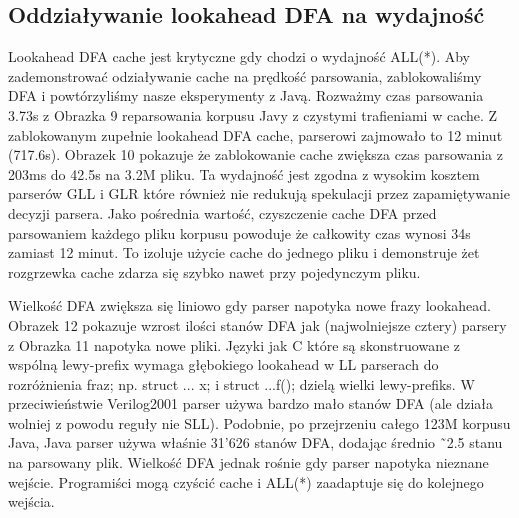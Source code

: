 \subsection{Oddziaływanie lookahead DFA na wydajność}
Lookahead DFA cache jest krytyczne gdy chodzi o wydajność ALL(*).
Aby zademonstrować odziaływanie cache na prędkość parsowania, zablokowaliśmy DFA
i powtórzyliśmy nasze eksperymenty z Javą.
Rozważmy czas parsowania 3.73s z Obrazka 9 reparsowania korpusu Javy z czystymi
trafieniami w cache.
Z zablokowanym zupełnie lookahead DFA cache, parserowi zajmowało to 12 minut (717.6s).
Obrazek 10 pokazuje że zablokowanie cache zwiększa czas parsowania z 203ms do 42.5s na 3.2M pliku.
Ta wydajność jest zgodna z wysokim kosztem parserów GLL i GLR które również nie redukują
spekulacji przez zapamiętywanie decyzji parsera.
Jako pośrednia wartość, czyszczenie cache DFA przed parsowaniem każdego pliku
korpusu powoduje że całkowity czas wynosi 34s zamiast 12 minut.
To izoluje użycie cache do jednego pliku i demonstruje żet rozgrzewka cache
zdarza się szybko nawet przy pojedynczym pliku.
\par
Wielkość DFA zwiększa się liniowo gdy parser napotyka nowe frazy lookahead.
Obrazek 12 pokazuje wzrost ilości stanów DFA jak (najwolniejsze cztery) parsery z Obrazka 11
napotyka nowe pliki. Języki jak C które są skonstruowane z
wspólną lewy-prefix wymaga głębokiego lookahead w LL parserach do
rozróżnienia fraz; np. struct {...} x; i struct {...}f(); dzielą wielki lewy-prefiks.
W przeciwieństwie Verilog2001 parser używa bardzo mało stanów DFA
(ale działa wolniej z powodu reguły nie SLL). Podobnie, po przejrzeniu całego 123M korpusu Java,
Java parser używa właśnie 31'626 stanów DFA, dodając średnio  ˜2.5 stanu na parsowany plik.
Wielkość DFA jednak rośnie gdy parser napotyka nieznane wejście.
Programiści mogą czyścić cache i ALL(*) zaadaptuje się do kolejnego wejścia.
